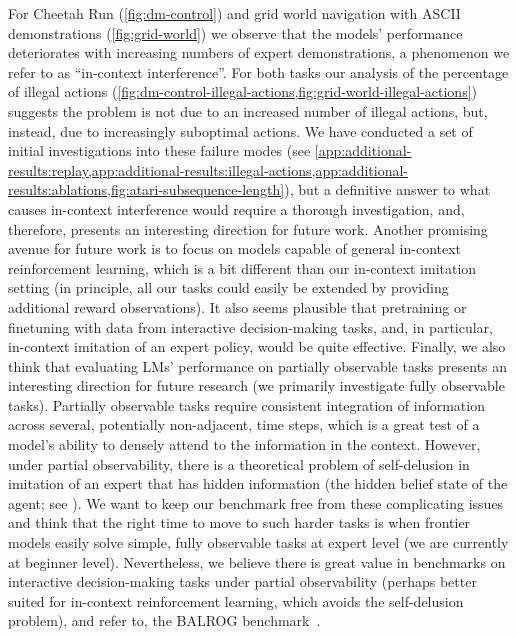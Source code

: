 For Cheetah Run (\cref{fig:dm-control}) and grid world navigation with ASCII demonstrations (\cref{fig:grid-world}) we observe that the models' performance deteriorates with increasing numbers of expert demonstrations, a phenomenon we refer to as ``in-context interference''.
For both tasks our analysis of the percentage of illegal actions (\cref{fig:dm-control-illegal-actions,fig:grid-world-illegal-actions}) suggests the problem is not due to an increased number of illegal actions, but, instead, due to increasingly suboptimal actions.
We have conducted a set of initial investigations into these failure modes (see \cref{app:additional-results:replay,app:additional-results:illegal-actions,app:additional-results:ablations,fig:atari-subsequence-length}), but 
a definitive answer to what causes in-context interference would require a thorough investigation, and, therefore, presents an interesting direction for future work.
Another promising avenue for future work is to focus on models capable of general in-context reinforcement learning, which is a bit different than our in-context imitation setting (in principle, all our tasks could easily be extended by providing additional reward observations). 
It also seems plausible that pretraining or finetuning with data from interactive decision-making tasks, and, in particular, in-context imitation of an expert policy, would be quite effective.
Finally, we also think that evaluating LMs' performance on partially observable tasks presents an interesting direction for future research (we primarily investigate fully observable tasks). 
Partially observable tasks require consistent integration of information across several, potentially non-adjacent, time steps, which is a great test of a model’s ability to densely attend to the information in the context.
However, under partial observability, there is a theoretical problem of self-delusion in imitation of an expert that has hidden information (\eg the hidden belief state of the agent; see \citet{ortega2021shaking}).
We want to keep our benchmark free from these complicating issues and think that the right time to move to such harder tasks is when frontier models easily solve simple, fully observable tasks at expert level (we are currently at beginner level).
Nevertheless, we believe there is great value in benchmarks on interactive decision-making tasks under partial observability (perhaps better suited for in-context reinforcement learning, which avoids the self-delusion problem), and refer to, \eg the BALROG benchmark~\citep{paglieri2025balrog}. 

